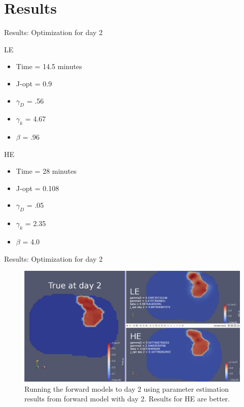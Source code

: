 \documentclass{beamer}
\begin{document}
\section{Results}
\begin{frame}{Results: Optimization for day 2}
	\begin{minipage}[T][.7\textheight][t]{.49\textwidth}
		LE
		\begin{itemize}
			\item Time = 14.5 minutes
			\item J-opt = 0.9
			\item $\gamma_D$ = .56
			\item $\gamma_k$ = 4.67
			\item $\beta$ = .96 
		\end{itemize}
	\end{minipage}
	\begin{minipage}[T][.7\textheight][t]{.49\textwidth}
		HE
		\begin{itemize}
			\item Time = 28 minutes 
			\item J-opt = 0.108
			\item $\gamma_D$ = .05
			\item $\gamma_k$ = 2.35
			\item $\beta$ = 4.0 
		\end{itemize}
	\end{minipage}
\end{frame}

\begin{frame}{Results: Optimization for day 2}
	\begin{figure}
    	\centering
    	\includegraphics[width=\textwidth]{opt_day2.jpg}    	
    	\caption{Running the forward models to day 2 using parameter estimation results from forward model with day 2. Results for HE are better.}
    	\end{figure}	
\end{frame}
\end{document}
